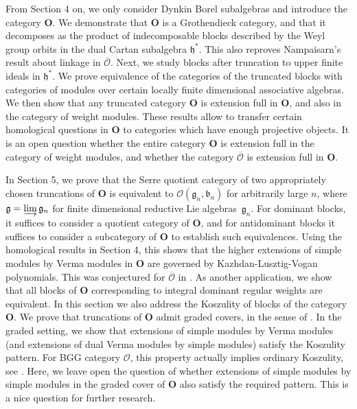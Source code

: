 \documentclass[11pt]{amsart}
\newcommand{\cO}{\mathcal O}
\newcommand{\bO}{\mathbf{O}}
\newcommand{\fg}{\mathfrak{g}}
\newcommand{\fh}{\mathfrak{h}}
\numberwithin{equation}{section}
\theoremstyle{plain}
\theoremstyle{remark}
\theoremstyle{remark}
\theoremstyle{construction}
\begin{document}
From Section 4 on, we only consider Dynkin Borel subalgebras and introduce the category $\bO$. We demonstrate that  $\bO$ {is a Grothendieck category, and that it} decomposes as the product of indecomposable blocks described by the Weyl group orbits in the dual Cartan subalgebra $\mathfrak{h}^*$. This also reproves Nampaisarn's result about linkage in $\overline{\mathcal{O}}$. Next, we study blocks after truncation to upper finite ideals in $\fh^\ast$. We prove equivalence of the categories of the truncated blocks with categories of modules over certain locally finite dimensional associative algebras. We then show that any truncated category $\bO$ is extension full in $\bO$, and also in the category of weight modules. These results allow to transfer certain homological questions in $\bO$ to categories which have enough projective objects. It is an open question whether the entire category $\bO$ is extension full in the category of weight modules, and whether the category $\overline{\mathcal{O}}$ is extension full in $\bO$.

In Section 5, we prove that the Serre quotient category of two appropriately chosen truncations of $\bO$ is equivalent to  
$\mathcal{O}(\mathfrak{g}_n,\mathfrak{b}_n)$ for arbitrarily large $n$, where $\fg=\varinjlim \fg_n$ for finite dimensional reductive Lie algebras~$\fg_n$. For dominant blocks, it suffices to consider a quotient category of $\bO$, and for antidominant blocks it suffices to consider a subcategory of $\bO$ to establish such equivalences. Using the homological results in Section 4, this shows that the higher extensions of simple modules by Verma modules in $\bO$ are governed by Kazhdan-Lusztig-Vogan polynomials. This was conjectured for $\overline{\cO}$ in \cite{NamT}.
As another application, we show that all blocks of $\bO$ corresponding to integral dominant regular weights are equivalent. In this section we also address the Koszulity of blocks of the category $\bO$. We prove that truncations of $\bO$ admit graded covers, in the sense of \cite{BGS}. In the graded setting, we show that extensions of simple modules by Verma modules (and extensions of dual Verma modules by simple modules) satisfy the Koszulity pattern. For BGG category $\cO$, this property actually implies ordinary Koszulity, see \cite{ADL}. Here, we leave open the question of whether extensions of simple modules by simple modules in the graded cover of $\bO$ also satisfy the required pattern. This is a nice question for further research.
\end{document}
